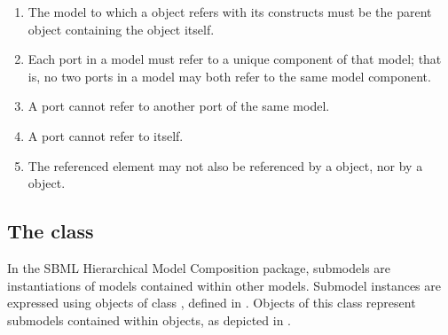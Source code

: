 \begin{enumerate}

  \item The model to which a \Port object refers with its \SBaseRef constructs
    must be the parent \Model object containing the \Port object itself.

  \item Each port in a model must refer to a unique component of that
    model; that is, no two ports in a model may both refer to the same
    model component.

  \item A port cannot refer to another port of the same model.

  \item A port cannot refer to itself.

  \item The referenced element may not also be referenced by a \ReplacedElement
    object, nor by a \ReplacedBy object.
    
\end{enumerate}
  
%


\subsection{The  class}
\label{submodel-class}
\label{listofdeletions-class}

In the SBML Hierarchical Model Composition package, submodels are
instantiations of models contained within other models.  Submodel
instances are expressed using objects of class \Submodel, defined in
.  Objects of this class represent submodels contained
within \Model objects, as depicted in .


